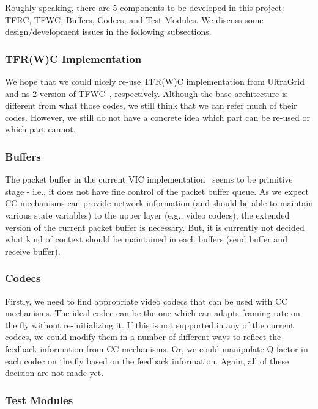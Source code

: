 Roughly speaking, there are 5 components to be developed in this project: TFRC,
TFWC, Buffers, Codecs, and Test Modules. We discuss some design/development
issues in the following subsections.


\subsubsection{\label{sssec:aim:cc}TFR(W)C Implementation}

We hope that we could nicely re-use TFR(W)C implementation from
UltraGrid~\cite{UltraGrid} and ns-2 version of TFWC~\cite{SH06}, respectively.
Although the base architecture is different from what those codes, we still
think that we can refer much of their codes. However, we still do not have a
concrete idea which part can be re-used or which part cannot.

\subsubsection{\label{sssec:aim:buffers}Buffers}

The packet buffer in the current VIC implementation~\cite{AVATS} seems to be
primitive stage - i.e., it does not have fine control of the packet buffer
queue.  As we expect CC mechanisms can provide network information (and should
be able to maintain various state variables) to the upper layer (e.g., video
codecs), the extended version of the current packet buffer is necessary. But, it
is currently not decided what kind of context should be maintained in each
buffers (send buffer and receive buffer).

\subsubsection{\label{sssec:aim:codecs}Codecs} 

Firstly, we need to find appropriate video codecs that can be used with CC
mechanisms. The ideal codec can be the one which can adapts framing rate on the
fly without re-initializing it. If this is not supported in any of the current
codecs, we could modify them in a number of different ways to reflect the
feedback information from CC mechanisms. Or, we could manipulate Q-factor in
each codec on the fly based on the feedback information. Again, all of these
decision are not made yet.

\subsubsection{\label{sssec:aim:test}Test Modules}


